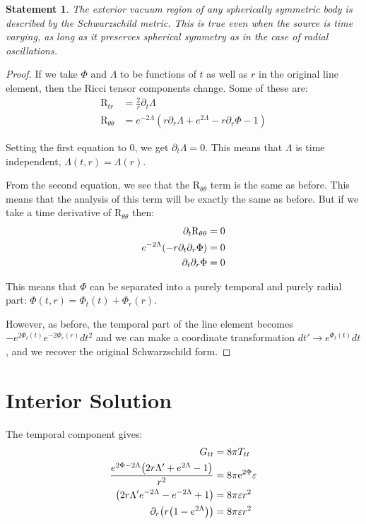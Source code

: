 \documentclass[12pt, letterpaper]{report}
\begin{document}
\newtheorem*{theorem}{Statement}
\begin{theorem}
    The exterior vacuum region of \emph{any} spherically symmetric body is described by the Schwarzschild metric. This is true even when the source is time varying, as long as it preserves spherical symmetry as in the case of radial oscillations.     
\end{theorem}
\renewcommand\qedsymbol{$\blacksquare$}
\begin{proof}
If we take $\Phi$ and $\Lambda$ to be functions of $t$ as well as $r$ in the original line element, then the Ricci tensor components change. Some of these are: 
\begin{align*}
    \text{R}_{tr} &= \frac{2}{r}\partial_t \Lambda\\
    \text{R}_{\theta \theta }&=e^{-2 \Lambda } \left(r \partial_r\Lambda+e^{2 \Lambda }-r \partial_r\Phi-1\right)
\end{align*}

Setting the first equation to 0, we get $\partial_t\Lambda= 0$. This means that $\Lambda$ is time independent, $\Lambda(t,r)= \Lambda(r)$. 

From the second equation, we see that the $\text{R}_{\theta \theta }$ term is the same as before. This means that the analysis of this term will be exactly the same as before. But if we take a time derivative of $\text{R}_{\theta \theta }$ then: 
\begin{align*}
    \partial_t\text{R}_{\theta \theta }&=0\\
    e^{-2\Lambda}\qty(-r\partial_t\partial_r\Phi)&= 0\\
    \partial_t\partial_r\Phi &= 0
\end{align*}

This means that $\Phi$ can be separated into a purely temporal and purely radial part: $\Phi(t,r)= \Phi_t(t)+\Phi_r(r)$. 

However, as before, the temporal part of the line element becomes $-e^{2\Phi_t(t)}e^{-2\Phi_r(r)}dt^2$ and we can make a coordinate transformation $dt' \rightarrow e^{\Phi_t(t)} dt$, and we recover the original Schwarzschild form. 
\end{proof}

\section{Interior Solution}

The temporal component gives: 
\begin{align*}
    G_{tt}&= 8\pi T_{tt}\\
    \frac{e^{2 \Phi-2 \Lambda } \qty(2 r \Lambda '+e^{2 \Lambda}-1)}{r^2}&= 8\pi\mathrm{e}^{2\Phi}\varepsilon\\
    \qty(2 r \Lambda 'e^{-2 \Lambda }-e^{-2 \Lambda }+1)&= 8\pi\varepsilon r^2\\
    \partial_r\qty(r\qty(1-e^{2 \Lambda}))&= 8\pi\varepsilon r^2
\end{align*}
\end{document}
